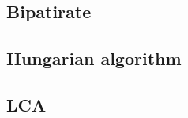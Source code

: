         \subsection{Bipatirate}
                
        \subsection{Hungarian algorithm}
                
        \subsection{LCA}
                

%                 
%                 

